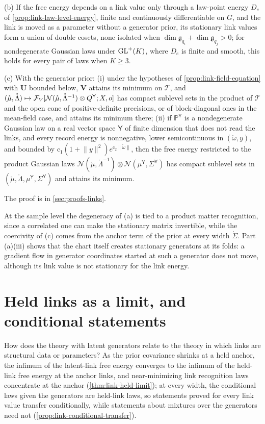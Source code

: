 (b) If the free energy depends on a link value only through a law-point energy $D_e$ of
\cref{prop:link-law-level-energy}, finite and continuously differentiable on $G$, and the link is moved as a
parameter without a generator prior, its stationary link values form a union of double cosets, none
isolated when $\dim\mathfrak g_{q_i}+\dim\mathfrak g_{q_j}>0$; for nondegenerate Gaussian laws under $\mathrm{GL}^+(K)$,
where $D_e$ is finite and smooth, this holds for every pair of laws when $K\geq3$.

(c) With the generator prior: (i) under the hypotheses of \cref{prop:link-field-equation} with $\mathbf U$
bounded below, $\mathbf V$ attains its minimum on $\mathscr T$, and
$(\mathring\mu,\mathring\Lambda)\mapsto\mathcal F_V[\mathcal N(\mathring\mu,\mathring\Lambda^{-1})\otimes Q^{\mathsf Y};X,o]$ has
compact sublevel sets in the product of $\mathscr T$ and the open cone of positive-definite precisions, or of
block-diagonal ones in the mean-field case, and attains its minimum there; (ii) if $\mathbb P^{\mathsf Y}$ is a
nondegenerate Gaussian law on a real vector space $\mathsf Y$ of finite dimension that does not read the links,
and every record energy is nonnegative, lower semicontinuous in $(\mathring\omega,y)$, and bounded by
$\mathrm c_1(1+\lVert y\rVert^2)e^{\mathrm c_2\lVert\mathring\omega\rVert}$, then the free energy restricted to the product
Gaussian laws $\mathcal N(\mathring\mu,\mathring\Lambda^{-1})\otimes\mathcal N(\mu^{\mathsf Y},\Sigma^{\mathsf Y})$ has compact sublevel
sets in $(\mathring\mu,\mathring\Lambda,\mu^{\mathsf Y},\Sigma^{\mathsf Y})$ and attains its minimum.

The proof is in \cref{sec:proofs-links}.

At the sample level the degeneracy of (a) is tied to a product matter recognition, since a correlated one
can make the stationary matrix invertible, while the coercivity of (c) comes from the anchor term of the
prior at every width $\mathring\Sigma$. Part (a)(iii) shows that the chart itself creates stationary generators
at its folds: a gradient flow in generator coordinates started at such a generator does not move, although
its link value is not stationary for the link energy.

\section{Held links as a limit, and conditional statements}
\label{sec:link-held}

How does the theory with latent generators relate to the theory in which links are structural data or
parameters? As the prior covariance shrinks at a held anchor, the infimum of the latent-link free energy
converges to the infimum of the held-link free energy at the anchor links, and near-minimizing link
recognition laws concentrate at the anchor (\cref{thm:link-held-limit}); at every width, the conditional
laws given the generators are held-link laws, so statements proved for every link value transfer
conditionally, while statements about mixtures over the generators need not
(\cref{prop:link-conditional-transfer}).

